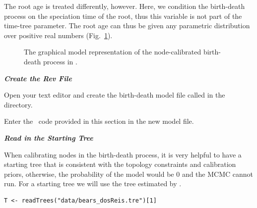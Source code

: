 The root age is treated differently, however. 
Here, we condition the birth-death process on the speciation time of the root, thus this variable is not part of the time-tree parameter. 
The root age can thus be given any parametric distribution over positive real numbers (Fig.~\ref{m_BDCal:fig}).

\begin{figure}[h!]
\centering
{}
\caption{\small The graphical model representation of the node-calibrated birth-death process in \RevBayes.}
\label{m_BDCal:fig}
\end{figure}

\textbf{\textit{Create the Rev File}}

{\begin{framed}
Open your text editor and create the birth-death model file called {\textcolor{red}{}} in the  directory.

Enter the \Rev~code provided in this section in the new model file.
\end{framed}}


\textbf{\textit{Read in the Starting Tree}}

When calibrating nodes in the birth-death process, it is very helpful to have a starting tree that is consistent with the topology constraints and calibration priors, otherwise, the probability of the model would be 0 and the MCMC cannot run.
For a starting tree we will use the tree estimated by \citet{dosReis2012}. 
{\tt \begin{snugshade*}
\begin{lstlisting}
T <- readTrees("data/bears_dosReis.tre")[1]
\end{lstlisting}
\end{snugshade*}}

